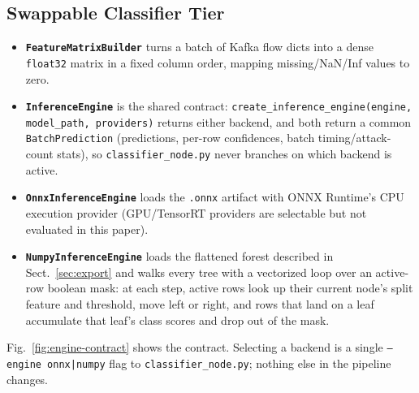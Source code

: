 \documentclass[runningheads]{llncs}
\begin{document}
\subsection{Swappable Classifier Tier}

\begin{itemize}
  \item \textbf{\texttt{FeatureMatrixBuilder}} turns a batch of Kafka flow dicts into a dense \texttt{float32} matrix in a fixed column order, mapping missing/NaN/Inf values to zero.
  \item \textbf{\texttt{InferenceEngine}} is the shared contract: \texttt{create\_inference\_engine(engine, model\_path, providers)} returns either backend, and both return a common \texttt{BatchPrediction} (predictions, per-row confidences, batch timing/attack-count stats), so \texttt{classifier\_node.py} never branches on which backend is active.
  \item \textbf{\texttt{OnnxInferenceEngine}} loads the \texttt{.onnx} artifact with ONNX Runtime's CPU execution provider (GPU/TensorRT providers are selectable but not evaluated in this paper).
  \item \textbf{\texttt{NumpyInferenceEngine}} loads the flattened forest described in Sect.~\ref{sec:export} and walks every tree with a vectorized loop over an active-row boolean mask: at each step, active rows look up their current node's split feature and threshold, move left or right, and rows that land on a leaf accumulate that leaf's class scores and drop out of the mask.
\end{itemize}

Fig.~\ref{fig:engine-contract} shows the contract. Selecting a backend is a single \texttt{--engine onnx|numpy} flag to \texttt{classifier\_node.py}; nothing else in the pipeline changes.
\end{document}
